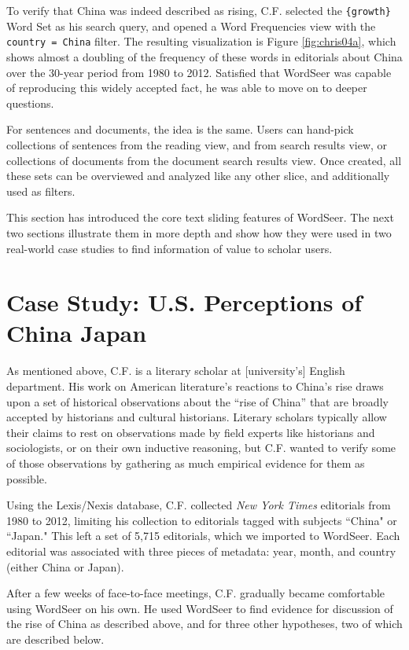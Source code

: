 \documentclass{sig-alternate}
\newcommand{\code}[1] {\texttt{#1}}
\begin{document}
To verify that China was indeed described as rising, C.F. selected the  \code{\{growth\}} Word Set as his search query, and opened a Word Frequencies view with the  \code{ country = China} filter. The resulting visualization is Figure \ref{fig:chris04a}, which shows almost a doubling of the frequency of these words in editorials about China over the 30-year period from 1980 to 2012. Satisfied that WordSeer was capable of reproducing this widely accepted fact, he was able to move on to deeper questions.

For sentences and documents, the idea is the same.  Users can hand-pick collections of sentences from the reading view, and from search results view, or collections of documents from the document search results view.  Once created, all these sets can be overviewed and analyzed like any other slice, and additionally used as filters.

This section has introduced the core text sliding features of WordSeer.  The next two sections illustrate them in more depth and show how they were used in two real-world case studies to find information of value to scholar users.

\section{Case Study: U.S. Perceptions of\\China Japan}

As mentioned above, C.F. is a literary scholar at [university's] English department. His work on American literature's reactions to China's rise draws upon a set of historical observations about the ``rise of China'' that are broadly accepted by historians and cultural historians. Literary scholars typically allow their claims to rest on observations made by field experts like historians and sociologists, or on their own inductive reasoning, but C.F. wanted to verify some of those observations by gathering as much empirical evidence for them as possible. 
 
Using the Lexis/Nexis database, C.F. collected \emph{New York Times} editorials from 1980 to 2012, limiting his collection to editorials tagged with subjects ``China" or ``Japan." This left a set of 5,715 editorials, which we imported to WordSeer. Each editorial was associated with three pieces of metadata: year, month, and country (either China or Japan).

After a few weeks of face-to-face meetings, C.F. gradually became comfortable using WordSeer on his own.  He used WordSeer to find evidence for discussion of the rise of China as described above, and for three other hypotheses, two of which are described below.
\end{document}
